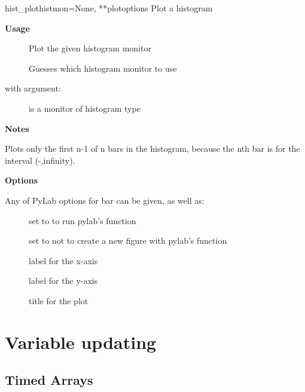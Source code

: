 \documentclass[letterpaper,10pt,english]{manual}
\begin{document}
\hypertarget{brian.hist_plot}{}\begin{funcdesc}{hist\_plot}{histmon=None, **plotoptions}
Plot a histogram

\textbf{Usage}
\begin{description}
\item[]
Plot the given histogram monitor

\item[]
Guesses which histogram monitor to use

\end{description}

with argument:
\begin{description}
\item[]
is a monitor of histogram type

\end{description}

\textbf{Notes}

Plots only the first n-1 of n bars in the histogram, because
the nth bar is for the interval (-,infinity).

\textbf{Options}

Any of PyLab options for bar can be given, as well as:
\begin{description}
\item[]
set to  to run pylab's  function

\item[]
set to  not to create a new figure with pylab's  function

\item[]
label for the x-axis

\item[]
label for the y-axis

\item[]
title for the plot

\end{description}
\end{funcdesc}

\resetcurrentobjects
\hypertarget{--doc-reference-variableupdating}{}

\section{Variable updating}


\subsection{Timed Arrays}
\end{document}

